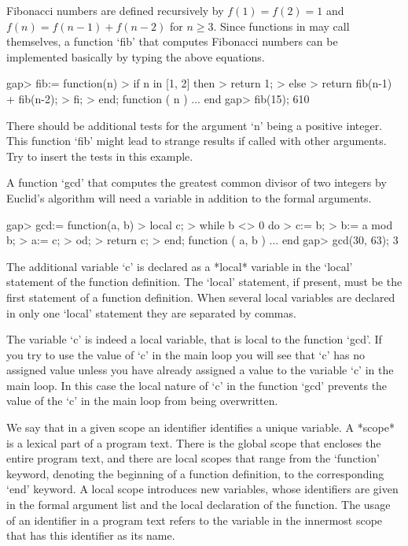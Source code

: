 Fibonacci numbers are defined recursively by $f(1) = f(2) =  1$ and
$f(n) =  f(n-1) + f(n-2)$ for $n \geq 3$.
Since functions in {\GAP} may call themselves,
a function `fib' that computes Fibonacci numbers can be implemented
basically by typing the above equations.

\beginexample
    gap> fib:= function(n)
    >       if n in [1, 2] then
    >          return 1;
    >       else
    >          return fib(n-1) + fib(n-2);
    >       fi;
    >    end;
    function ( n ) ... end
    gap> fib(15);
    610
\endexample

There should be additional tests for the  argument  `n' being  a positive
integer.   This  function `fib' might  lead to strange  results if called
with other arguments.  Try to insert the tests in this example.


A function   `gcd' that  computes the   greatest  common divisor   of two
integers  by Euclid's algorithm  will need a variable  in addition to the
formal arguments.

\beginexample
    gap> gcd:= function(a, b)
    >       local c;
    >       while b <> 0 do
    >          c:= b;
    >          b:= a mod b;
    >          a:= c;
    >       od;
    >       return c;
    >    end;
    function ( a, b ) ... end
    gap> gcd(30, 63);
    3
\endexample

The additional  variable `c'  is declared as  a  *local*  variable in the
`local' statement  of the function definition.  The `local' statement, if
present, must  be the first  statement of  a function  definition.   When
several local variables are  declared in only one  `local' statement they
are separated by commas.

The  variable `c'  is  indeed  a local  variable,  that  is local to  the
function `gcd'.  If you try  to use the value of `c' in the main loop you
will see that `c'  has no assigned value unless you have already assigned
a value to the variable `c'  in  the  main loop.  In this case  the local
nature of `c' in the function `gcd' prevents  the value of the `c' in the
main loop from being overwritten.

We say  that in a given scope an identifier identifies a unique variable.
A *scope* is a lexical part of a program text.  There is the global scope
that encloses  the  entire program text, and there are local  scopes that
range from the `function'  keyword, denoting the beginning of  a function
definition, to the corresponding `end' keyword.  A local scope introduces
new  variables, whose identifiers are  given in the formal argument  list
and the local declaration of the function.  The usage of an identifier in
a program text refers to  the  variable in  the  innermost scope that has
this identifier as its name.

